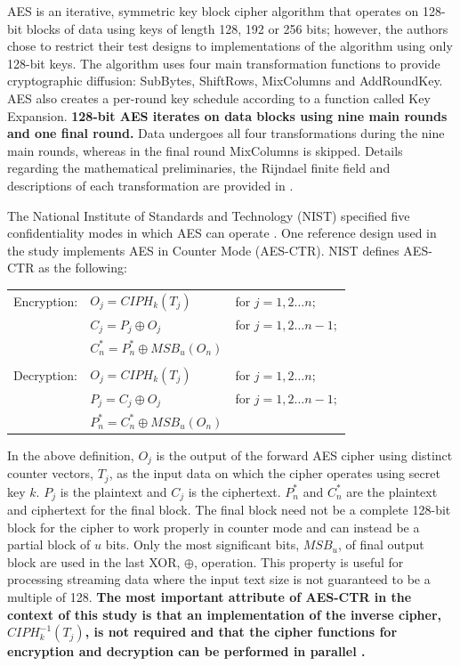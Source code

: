 \documentclass[12pt,journal,compsoc,onecolumn]{IEEEtran}
\begin{document}
AES is an iterative, symmetric key block cipher algorithm that operates on 128-bit blocks of data using keys of length 128, 192 or 256 bits; however, the authors chose to restrict their test designs to implementations of the algorithm using only 128-bit keys. The algorithm uses four main transformation functions to provide cryptographic diffusion: SubBytes, ShiftRows, MixColumns and AddRoundKey. AES also creates a per-round key schedule according to a function called Key Expansion. \textbf{128-bit AES iterates on data blocks using nine main rounds and one final round.} Data undergoes all four transformations during the nine main rounds, whereas in the final round MixColumns is skipped. Details regarding the mathematical preliminaries, the Rijndael finite field and descriptions of each transformation are provided in \cite{13}. 

The National Institute of Standards and Technology (NIST) specified five confidentiality modes in which AES can operate \cite{14}. One reference design used in the study implements AES in Counter Mode (AES-CTR). NIST defines AES-CTR as the following:

\begin{table}[!htb]
	\centering
	\begin{tabular}{l l l}
	Encryption: & $O_j=CIPH_k(T_j)$ & for $j=1,2\dots n;$\\
		 & $C_j=P_j\oplus O_j$ & for $j=1,2\dots n-1;$\\
		 & $C^*_n=P^*_n\oplus MSB_u(O_n)$ & \\
		 \\
	Decryption: & $O_j=CIPH_k(T_j)$ & for $j=1,2\dots n;$\\
		 & $P_j=C_j\oplus O_j$ & for $j=1,2\dots n-1;$\\
		 & $P^*_n=C^*_n\oplus MSB_u(O_n)$ & 
	\end{tabular}
	\label{tab:ctr}
\end{table}

In the above definition, $O_j$ is the output of the forward AES cipher using distinct counter vectors, $T_j$, as the input data on which the cipher operates using secret key $k$. $P_j$ is the plaintext and $C_j$ is the ciphertext. $P^*_n$ and $C^*_n$ are the plaintext and ciphertext for the final block. The final block need not be a complete 128-bit block for the cipher to work properly in counter mode and can instead be a partial block of $u$ bits. Only the most significant bits, $MSB_u$, of final output block are used in the last XOR, $\oplus$, operation.  This property is useful for processing streaming data where the input text size is not guaranteed to be a multiple of 128\cite{15}\cite{16}. \textbf{The most important attribute of AES-CTR in the context of this study is that an implementation of the inverse cipher, $CIPH^{-1}_k(T_j)$, is not required and that the cipher functions for encryption and decryption can be performed in parallel \cite{10}.}
\end{document}
